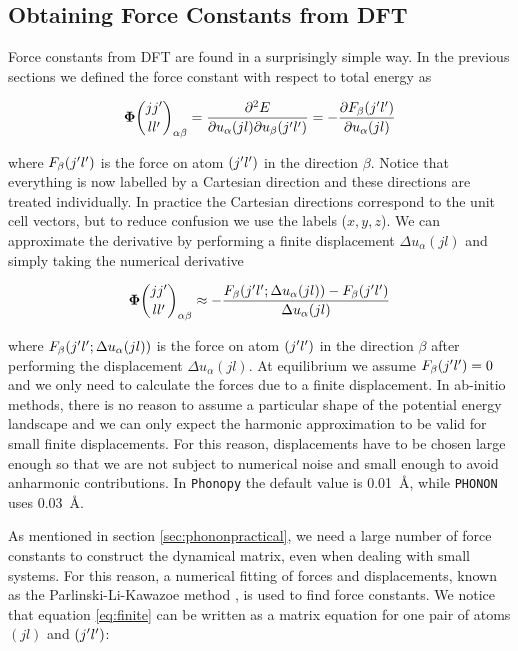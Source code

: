 \subsection{Obtaining Force Constants from DFT}\label{sec:forceDFT}
Force constants from DFT are found in a surprisingly simple way. In the previous sections we defined the force constant with respect to total energy as

\[ \fc  _{\alpha \beta} = \frac{\partial ^2 E}{\partial u_\alpha (jl) \partial u_\beta (\jp \lp)} = - \frac{\partial F_\beta (\jp \lp)}{\partial u_\alpha (jl)} \]

\noindent where $F_\beta (j^\prime l^\prime)$ is the force on atom $(j^\prime l^\prime)$ in the direction $\beta$. Notice that everything is now labelled by a Cartesian direction and these directions are treated individually. In practice the Cartesian directions correspond to the unit cell vectors, but to reduce confusion we use the labels ($x,y,z$). We can approximate the derivative by performing a finite displacement $\Delta u_\alpha(jl)$ and simply taking the numerical derivative


\begin{equation}
\fc _{\alpha \beta} \approx - \frac{F_\beta (\jp \lp; \Delta u_\alpha (jl)) - F_\beta (\jp\lp)}{\Delta u_\alpha (jl)} \label{eq:finite}
\end{equation}


\noindent where $F_\beta (j^\prime l^\prime;\Delta u_\alpha (jl))$ is the force on atom $(j^\prime l^\prime)$ in the direction $\beta$ after performing the displacement $\Delta u_\alpha (jl)$. At equilibrium we assume $F_\beta (j^\prime l^\prime) = 0$ and we only need to calculate the forces due to a finite displacement. In ab-initio methods, there is no reason to assume a particular shape of the potential energy landscape and we can only expect the harmonic approximation to be valid for small finite displacements. For this reason, displacements have to be chosen large enough so that we are not subject to numerical noise and small enough to avoid anharmonic contributions. In \texttt{Phonopy} the default value is \SI{0.01}{\angstrom}, while \texttt{PHONON} uses \SI{0.03}{\angstrom}.

As mentioned in section \ref{sec:phononpractical}, we need a large number of force constants to construct the dynamical matrix, even when dealing with small systems. For this reason, a numerical fitting of forces and displacements, known as the Parlinski-Li-Kawazoe method \cite{Parlinski1997}, is used to find force constants. We notice that equation \eqref{eq:finite} can be written as a matrix equation for one pair of atoms $(jl)$ and $(j^\prime l^\prime)$:

